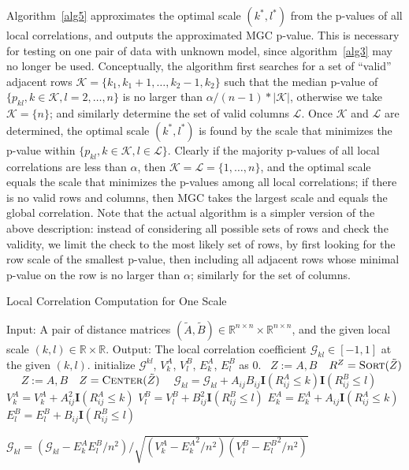 \documentclass[11pt]{article}
\providecommand{\mb}[1]{\boldsymbol{#1}}
\newcommand{\Real}{\mathbb{R}}
\newcommand{\G}{\mathcal{G}}
\newcommand{\K}{\mathcal{K}}
\newcommand{\LL}{\mathcal{L}}
\newcommand{\Linefor}[2]{%
    \State \algorithmicfor\ {#1}\ \algorithmicdo\ {#2} \algorithmicend\ \algorithmicfor%
}
\begin{document}
Algorithm~\ref{alg5} approximates the optimal scale $(k^{*},l^{*})$ from the p-values of all local correlations, and outputs the approximated MGC p-value. This is necessary for testing on one pair of data with unknown model, since algorithm~\ref{alg3} may no longer be used. Conceptually, the algorithm first searches for a set of ``valid'' adjacent rows $\K=\{k_{1},k_{1}+1,\ldots,k_{2}-1,k_{2}\}$ such that the median p-value of $\{p_{kl},k \in \K, l=2,\ldots,n\}$ is no larger than $\alpha /(n-1) * |\K|$, otherwise we take $\K=\{n\}$; and similarly determine the set of valid columns $\LL$. Once $\K$ and $\LL$ are determined, the optimal scale $(k^{*},l^{*})$ is found by the scale that minimizes the p-value within $\{p_{kl},k \in \K, l \in \LL\}$. Clearly if the majority p-values of all local correlations are less than $\alpha$, then $\K=\LL=\{1,\ldots,n\}$, and the optimal scale equals the scale that minimizes the p-values among all local correlations; if there is no valid rows and columns, then MGC takes the largest scale and equals the global correlation. Note that the actual algorithm is a simpler version of the above description: instead of considering all possible sets of rows and check the validity, we limit the check to the most likely set of rows, by first looking for the row scale of the smallest p-value, then including all adjacent rows whose minimal p-value on the row is no larger than $\alpha$; similarly for the set of columns.

\begin{algorithm}
\caption{Local Correlation Computation for One Scale}
\label{alg1}
\begin{algorithmic}[1]
\Statex Input: A pair of distance matrices $(\tilde{A},\tilde{B}) \in \Real^{n \times n} \times \Real^{n \times n}$, and the given local scale $(k,l) \in \Real \times \Real$.
\Statex Output: The local correlation coefficient $\G_{kl} \in [-1,1]$ at the given $(k,l)$.
\State initialize $\G^{kl}$, $V^{A}_{k}$, $V^{B}_{l}$, $E^{A}_{k}$, $E^{B}_{l}$ as $0$.
\Linefor{$Z:=A,B$}{$R^{Z}=\textsc{Sort}(\tilde{Z})$} 
\Linefor{$Z:=A,B$}{$Z=\textsc{Center}(\tilde{Z})$} 
\State $\G_{kl}=\G_{kl}+A_{ij}B_{ij}\mb{I}(R^{A}_{ij} \leq k)\mb{I}(R^{B}_{ij} \leq l)$ 
\State $V^{A}_{k}=V^{A}_{k}+A_{ij}^2\mb{I}(R^{A}_{ij} \leq k)$ 
\State $V^{B}_{l}=V^{B}_{l}+B_{ij}^2\mb{I}(R^{B}_{ij} \leq l)$ 
\State $E^{A}_{k}=E^{A}_{k}+A_{ij}\mb{I}(R^{A}_{ij} \leq k)$ 
\State $E^{B}_{l}=E^{B}_{l}+B_{ij}\mb{I}(R^{B}_{ij} \leq l)$
\EndFor

\State $\G_{kl}=\left(\G_{kl}-E^{A}_{k}E^{B}_{l}/n^2\right)/\sqrt{\left(V^{A}_{k}-{E^{A}_{k}}^2/n^2\right) \left(V^{B}_{l}-{E^{B}_{l}}^2/n^2\right)}$ 

\EndFunction
\end{algorithmic}
\end{algorithm}
\end{document}
